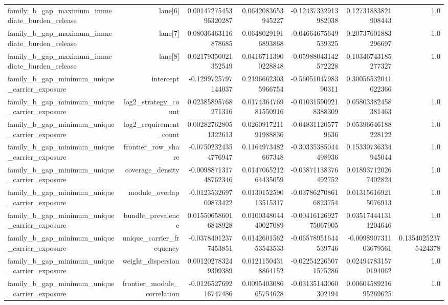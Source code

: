 {\begin{longtable}{lrrrrrr}
family\_b\_gap\_maximum\_immediate\_burden\_release & lane[6] & 0.0014727545396320287 & 0.0642083653945227 & -0.12437332913982038 & 0.12731883821908443 & 1.0 \\
family\_b\_gap\_maximum\_immediate\_burden\_release & lane[7] & 0.08036463116878685 & 0.06480291916893868 & -0.04664675649539325 & 0.20737601883296697 & 1.0 \\
family\_b\_gap\_maximum\_immediate\_burden\_release & lane[8] & 0.02179350021352549 & 0.04167113900228848 & -0.05988043142572228 & 0.10346743185277327 & 1.0 \\
family\_b\_gap\_minimum\_unique\_carrier\_exposure & intercept & -0.1299725797144037 & 0.21966623035966754 & -0.5605104798390311 & 0.30056532041022366 &  \\
family\_b\_gap\_minimum\_unique\_carrier\_exposure & log2\_strategy\_count & 0.02385895768271316 & 0.017436476981550916 & -0.010315909218388309 & 0.05803382458381463 & 1.0 \\
family\_b\_gap\_minimum\_unique\_carrier\_exposure & log2\_requirement\_count & 0.002827628051322613 & 0.026091721191988836 & -0.048311205779636 & 0.05396646188228122 & 1.0 \\
family\_b\_gap\_minimum\_unique\_carrier\_exposure & frontier\_row\_share & -0.07502324354776947 & 0.1164973482667348 & -0.30335385044498936 & 0.15330736334945044 & 1.0 \\
family\_b\_gap\_minimum\_unique\_carrier\_exposure & coverage\_density & -0.009887131748762346 & 0.014706521264435059 & -0.03871138376492752 & 0.018937120267402824 & 1.0 \\
family\_b\_gap\_minimum\_unique\_carrier\_exposure & module\_overlap & -0.012353269700873422 & 0.013015259013515317 & -0.037862708616823754 & 0.013156169215076913 & 1.0 \\
family\_b\_gap\_minimum\_unique\_carrier\_exposure & bundle\_prevalence & 0.015506586016848928 & 0.010034804440027089 & -0.0041612692775067905 & 0.035174441311204646 & 1.0 \\
family\_b\_gap\_minimum\_unique\_carrier\_exposure & unique\_carrier\_frequency & -0.03784012377453851 & 0.014260156253543533 & -0.06578951644539746 & -0.009890731103679561 & 0.13540252375424378 \\
family\_b\_gap\_minimum\_unique\_carrier\_exposure & weight\_dispersion & 0.001202783249309389 & 0.01211504318864152 & -0.022542265071575286 & 0.024947831570194062 & 1.0 \\
family\_b\_gap\_minimum\_unique\_carrier\_exposure & frontier\_module\_correlation & -0.012652769216747486 & 0.009540308665754628 & -0.03135143060302194 & 0.0060458921695269625 & 1.0 \\

\end{longtable}}
